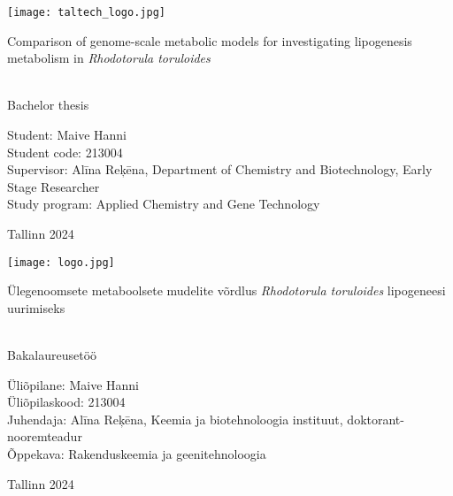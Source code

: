 \documentclass[a4paper, 11pt]{report}
\begin{document}
\begin{titlepage}
    \texttt{[image: taltech\_logo.jpg]}

    \begin{center}
        \vspace{35mm}
        \begin{LARGE}
            Comparison of genome-scale metabolic models for investigating 
            lipogenesis metabolism in \textit{Rhodotorula toruloides}
        \end{LARGE} \\
             Bachelor thesis

        \vspace{30mm}
        \hfill
        \parbox{50mm}{
            \flushleft
            Student: Maive Hanni \\
            Student code: 213004 \\
            Supervisor: Alīna Reķēna, 
            Department of Chemistry and Biotechnology, %
            Early Stage Researcher \\  %
            Study program: Applied Chemistry and Gene Technology
            }

            


        \vfill
        Tallinn 2024
    \end{center}
\end{titlepage}

\begin{titlepage}
    \texttt{[image: logo.jpg]}

    \begin{center}
        \vspace{35mm}
        \begin{LARGE}
            Ülegenoomsete metaboolsete mudelite võrdlus \textit{Rhodotorula toruloides} lipogeneesi uurimiseks
        \end{LARGE} \\
            Bakalaureusetöö

        \vspace{30mm}
        \hfill
        \parbox{50mm}{
            \flushleft
            Üliõpilane: Maive Hanni \\
            Üliõpilaskood: 213004 \\
            Juhendaja: Alīna Reķēna,
            Keemia ja biotehnoloogia instituut, %
            doktorant-nooremteadur \\ %
            Õppekava: Rakenduskeemia ja geenitehnoloogia
            }

        \vfill
        Tallinn 2024
    \end{center}
\end{titlepage}
\end{document}
